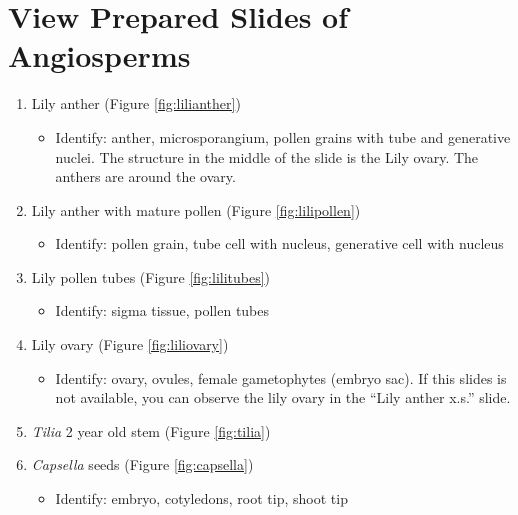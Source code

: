 \documentclass[]{book}
\providecommand{\tightlist}{%
  \setlength{\itemsep}{0pt}\setlength{\parskip}{0pt}}
\theoremstyle{definition}
\theoremstyle{definition}
\theoremstyle{definition}
\theoremstyle{remark}
\begin{document}
\section{View Prepared Slides of
Angiosperms}\label{view-prepared-slides-of-angiosperms}

\begin{enumerate}
\def\labelenumi{\arabic{enumi}.}
\tightlist
\item
  Lily anther (Figure \ref{fig:lilianther})

  \begin{itemize}
  \tightlist
  \item
    Identify: anther, microsporangium, pollen grains with tube and
    generative nuclei. The structure in the middle of the slide is the
    Lily ovary. The anthers are around the ovary.
  \end{itemize}
\item
  Lily anther with mature pollen (Figure \ref{fig:lilipollen})

  \begin{itemize}
  \tightlist
  \item
    Identify: pollen grain, tube cell with nucleus, generative cell with
    nucleus
  \end{itemize}
\item
  Lily pollen tubes (Figure \ref{fig:lilitubes})

  \begin{itemize}
  \tightlist
  \item
    Identify: sigma tissue, pollen tubes
  \end{itemize}
\item
  Lily ovary (Figure \ref{fig:liliovary})

  \begin{itemize}
  \tightlist
  \item
    Identify: ovary, ovules, female gametophytes (embryo sac). If this
    slides is not available, you can observe the lily ovary in the
    ``Lily anther x.s.'' slide.
  \end{itemize}
\item
  \emph{Tilia} 2 year old stem (Figure \ref{fig:tilia})
\item
  \emph{Capsella} seeds (Figure \ref{fig:capsella})

  \begin{itemize}
  \tightlist
  \item
    Identify: embryo, cotyledons, root tip, shoot tip
  \end{itemize}
\end{enumerate}
\end{document}
